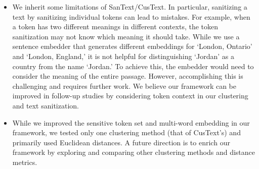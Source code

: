 \documentclass[11pt]{article}
\newcommand{\clusant}{CluSanT\xspace}
\begin{document}
\begin{itemize}
\setlength\itemsep{0em}
    \item We inherit some limitations of SanText/CusText. In particular, sanitizing a text by sanitizing individual tokens can lead to mistakes. For example, when a token has two different meanings in different contexts, the token sanitization may not know which meaning it should take. 
    While we use a sentence embedder that generates different embeddings for `London, Ontario' and `London, England,' it is not helpful for distinguishing `Jordan' as a country from the name `Jordan.' 
    To achieve this, the embedder would need to consider the meaning of the entire passage. 
    However, accomplishing this is challenging and requires further work. We believe our framework can be improved in follow-up studies by considering token context in our clustering and text sanitization.
    

    \item While we improved the sensitive token set and multi-word embedding in our framework, we tested only one clustering method (that of CusText's) and primarily used Euclidean distances. A future direction is to enrich our framework by exploring and comparing other clustering methods and distance metrics. 

\end{itemize}













%
% 

\appendix


\end{document}
